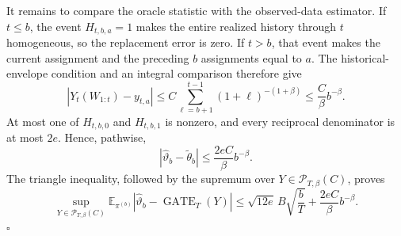 It remains to compare the oracle statistic with the observed-data estimator. If \(t\le b\), the event \(H_{t,b,a}=1\) makes the entire realized history through \(t\) homogeneous, so the replacement error is zero. If \(t>b\), that event makes the current assignment and the preceding \(b\) assignments equal to \(a\). The historical-envelope condition and an integral comparison therefore give
\[
\left|Y_t(W_{1:t})-y_{t,a}\right|
\le C\sum_{\ell=b+1}^{t-1}(1+\ell)^{-(1+\beta)}
\le\frac{C}{\beta}b^{-\beta}.
\]
At most one of \(H_{t,b,0}\) and \(H_{t,b,1}\) is nonzero, and every reciprocal denominator is at most \(2e\). Hence, pathwise,
\[
|\widehat\vartheta_b-\widetilde\theta_b|
\le\frac{2eC}{\beta}b^{-\beta}.
\]
The triangle inequality, followed by the supremum over \(Y\in\mathcal P_{T,\beta}(C)\), proves
\[
\sup_{Y\in\mathcal P_{T,\beta}(C)}
\mathbb E_{\pi^{(b)}}|\widehat\vartheta_b-\operatorname{GATE}_T(Y)|
\le\sqrt{12e}\,B\sqrt{\frac bT}+\frac{2eC}{\beta}b^{-\beta}.
\]
\(\square\)